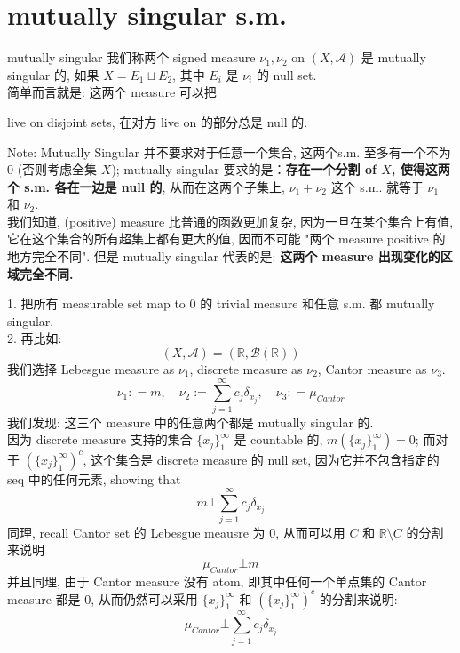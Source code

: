 \documentclass[lang=cn,11pt]{elegantbook}
\begin{document}
\section{mutually singular s.m.}
\begin{definition}{mutually singular}
    我们称两个 signed measure $\nu_1, \nu_2$ on $(X,\mathcal{A})$ 是 mutually singular 的, 如果 $X = E_1 \sqcup E_2$, 其中 $E_i$ 是 $\nu_i$ 的 null set.\\
    简单而言就是: 这两个 measure 可以把
    
    live on disjoint sets, 在对方 live on 的部分总是 null 的. 
\end{definition}
\begin{remark}
    Note: Mutually Singular 并不要求对于任意一个集合, 这两个s.m. 至多有一个不为 $0$ (否则考虑全集 $X$); mutually singular 要求的是：\textbf{存在一个分割 of $X$, 使得这两个 s.m. 各在一边是 null 的}, 从而在这两个子集上, $\nu_1 + \nu_2$ 这个 s.m. 就等于 $\nu_1$ 和 $\nu_2$.\\
    我们知道, (positive) measure 比普通的函数更加复杂, 因为一旦在某个集合上有值, 它在这个集合的所有超集上都有更大的值, 因而不可能 "两个 measure positive 的地方完全不同". 但是 mutually singular 代表的是: \textbf{这两个 measure 出现变化的区域完全不同.}
\end{remark}
\begin{example}
    1. 把所有 measurable set map to $0$ 的 trivial measure 和任意 s.m. 都 mutually singular.\\
    2. 再比如: \[
    (X,\mathcal{A}) = (\mathbb{R},\mathcal{B}(\mathbb{R}))
    \]
 我们选择 Lebesgue measure as $\nu_1$, discrete measure as $\nu_2$, Cantor measure as $\nu_3$.    \[
    \nu_1 : = m,\quad \nu_2 := \sum_{j=1}^\infty c_j \delta_{x_j},\quad \nu_3 : = \mu_{Cantor}
    \]
我们发现: 这三个 measure 中的任意两个都是 mutually singular 的.\\
因为 discrete measure 支持的集合 $\{ x_j\}_1^\infty$ 是 countable 的, $m(\{ x_j\}_1^\infty) = 0$; 而对于 $(\{ x_j\}_1^\infty)^c$, 这个集合是 discrete measure 的 null set, 因为它并不包含指定的 seq 中的任何元素, showing that \[
 m \bot  \sum_{j=1}^\infty c_j \delta_{x_j}
\]
同理, recall Cantor set 的 Lebesgue meausre 为 $0$, 从而可以用 $C$ 和 $\mathbb{R}\setminus C$ 的分割来说明 \[
\mu_{Cantor} \bot m
\]
并且同理, 由于 Cantor measure 没有 atom, 即其中任何一个单点集的 Cantor measure 都是 $0$, 从而仍然可以采用 $\{ x_j\}_1^\infty$ 和 $(\{ x_j\}_1^\infty)^c$ 的分割来说明:  \[
\mu_{Cantor} \bot  \sum_{j=1}^\infty c_j \delta_{x_j}
\]
\end{example}
\end{document}
